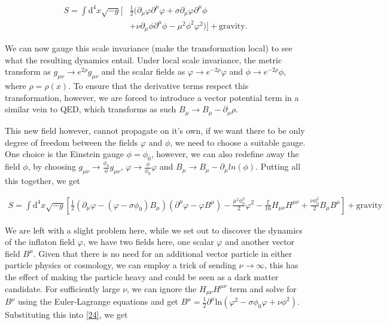 \documentclass[aps,prd,reprint,preprintnumbers,showpacs,floatfix,nofootinbib,superscript address]{revtex4-2}
\begin{document}
\begin{subequations}\label{23}
\begin{align}
    S = \int \mathrm{d}^4 x \sqrt{-g} \bigg[ &\frac{1}{2} \Big( \partial_\mu \varphi \partial^\mu \varphi + \sigma \partial_\mu \varphi \partial^\mu \phi \nonumber\\
    &+ \nu \partial_\mu \phi \partial^\mu \phi - \mu^2 \phi^2 \varphi^2 \Big) \bigg] + \text{gravity}.
\end{align}
\end{subequations}

We can now gauge this scale invariance (make the transformation local) to see what the resulting dynamics entail. Under local scale invariance, the metric transform as $g_{\mu \nu} \rightarrow e^{2\rho} g_{\mu \nu}$ and the scalar fields as $\varphi \rightarrow e^{-2\rho} \varphi$ and $\phi \rightarrow e^{-2\rho} \phi$, where $\rho = \rho(x)$. To ensure that the derivative terms respect this transformation, however, we are forced to introduce a vector potential term in a similar vein to QED, which transforms as such $B_{\mu} \rightarrow B_{\mu} - \partial_{\mu}\rho$.

This new field however, cannot propagate on it's own, if we want there to be only degree of freedom between the fields $\varphi$ and $\phi$, we need to choose a suitable gauge. One choice is the Einstein gauge $\phi = \phi_{0}$, however, we can also redefine away the field $\phi$, by choosing $g_{\mu \nu} \rightarrow \frac{\phi_0}{\phi} g_{\mu \nu}$, $\varphi \rightarrow \frac{\phi}{\phi_0} \varphi$ and $B_{\mu} \rightarrow B_{\mu} - \partial_{\mu} ln(\phi)$. Putting all this together, we get

\begin{widetext}
\begin{subequations}
\begin{align}\label{24}
    S = \int \mathrm{d}^4 x \sqrt{-g} \left[ \frac{1}{2}  (\partial_\mu \varphi - (\varphi - \sigma \phi_0)B_\mu)(\partial^\mu \varphi - \varphi B^\mu)  - 
    \frac{\mu^2\phi_{0}^{2}}{2} \varphi^2 - \frac{\xi}{16} H_{\mu\nu}H^{\mu\nu} + \frac{\nu \phi_{0}^{2}}{2} B_\mu B^\mu \right] + \text{gravity}
\end{align}
\end{subequations}
\end{widetext}

We are left with a slight problem here, while we set out to discover the dynamics of the inflaton field $\varphi$, we have two fields here, one scalar $\varphi$ and another vector field $B^\mu$. Given that there is no need for an additional vector particle in either particle physics or cosmology, we can employ a trick of sending $\nu \rightarrow \infty$, this has the effect of making the particle heavy and could be seen as a dark matter candidate. For sufficiently large $\nu$, we can ignore the $H_{\mu\nu}H^{\mu\nu}$ term and solve for $B^\mu$ using the Euler-Lagrange equations and get $B^\mu = \frac{1}{2} \partial^\mu \text{ln}(\varphi^2 - \sigma \phi_0 \varphi + \nu \phi^2)$. Substituting this into \ref{24}, we get
\end{document}
